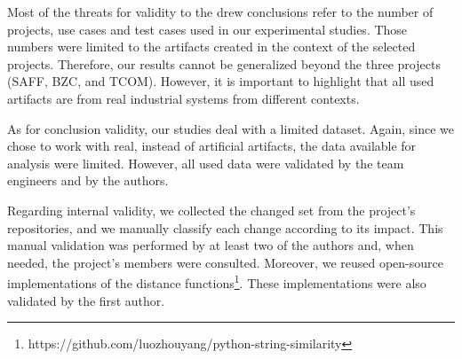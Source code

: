 Most of the threats for validity to the drew conclusions refer to the number of projects, use cases and test cases used in our experimental studies. Those numbers were limited to the artifacts created in the context of the selected projects. Therefore, our results cannot be generalized beyond the three projects (SAFF, BZC, and TCOM). However, it is important to highlight that all used artifacts are from real industrial systems from different contexts. 

As for conclusion validity, our studies deal with
a limited dataset. Again, since we chose to work with real, instead of artificial artifacts, the data available for analysis were limited. However, all used data were validated by the team engineers
and by the authors.

Regarding internal validity, we collected the changed set from the project's repositories, and we manually classify each change according to its impact. This manual validation was performed by at least two of the authors and, when needed, the project’s members were consulted. Moreover, we reused open-source implementations of the distance functions\footnote{https://github.com/luozhouyang/python-string-similarity}. These implementations were also validated by the first author.